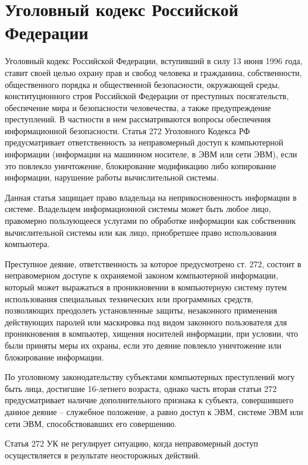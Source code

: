 \section{Уголовный кодекс Российской Федерации} \label{rights_uk}

Уголовный кодекс Российской Федерации, вступивший в силу 13 июня 1996 года, ставит своей целью охрану прав и свобод человека и гражданина, собственности, общественного порядка и общественной безопасности, окружающей среды, конституционного строя Российской Федерации от преступных посягательств, обеспечение мира и безопасности человечества, а также предупреждение преступлений. В частности в нем рассматриваются вопросы обеспечения информационной безопасности. Статья 272 Уголовного Кодекса РФ предусматривает ответственность за неправомерный доступ к компьютерной информации (информации на машинном носителе, в ЭВМ или сети ЭВМ), если это повлекло уничтожение, блокирование модификацию либо копирование информации, нарушение работы вычислительной системы.

\vspace{\baselineskip}
Данная статья защищает право владельца на неприкосновенность информации в системе. Владельцем информационной системы может быть любое лицо, правомерно пользующееся услугами по обработке информации как собственник вычислительной системы или как лицо, приобретшее право использования компьютера.

\vspace{\baselineskip}
Преступное деяние, ответственность за которое предусмотрено ст. 272, состоит в неправомерном доступе к охраняемой законом компьютерной информации, который может выражаться в проникновении в компьютерную систему путем использования специальных технических или программных средств, позволяющих преодолеть установленные защиты, незаконного применения действующих паролей или маскировка под видом законного пользователя для проникновения в компьютер, хищения носителей информации, при условии, что были приняты меры их охраны, если это деяние повлекло уничтожение или блокирование информации.

\vspace{\baselineskip}
По уголовному законодательству субъектами компьютерных преступлений могу быть лица, достигшие 16-летнего возраста, однако часть вторая статьи 272 предусматривает наличие дополнительного признака к субъекта, совершившего данное деяние -- служебное положение, а равно доступ к ЭВМ, системе ЭВМ или сети ЭВМ, способствовавших его совершению.

\vspace{\baselineskip}
Статья 272 УК не регулирует ситуацию, когда неправомерный доступ осуществляется в результате неосторожных действий.